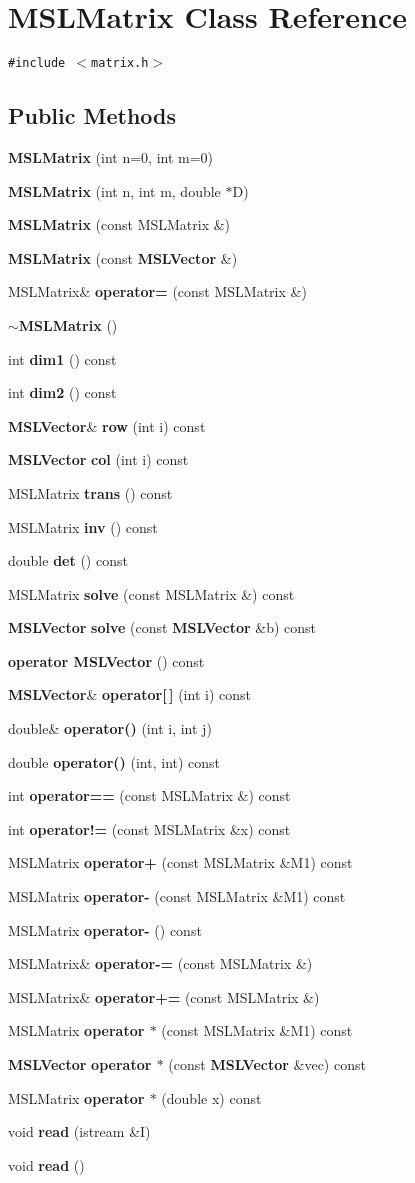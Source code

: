 \section{MSLMatrix  Class Reference}
\label{classMSLMatrix}
{\tt \#include $<$matrix.h$>$}

\subsection*{Public Methods}
\begin{CompactItemize}
\item 
{\bf MSLMatrix} (int n=0, int m=0)
\item 
{\bf MSLMatrix} (int n, int m, double $\ast$D)
\item 
{\bf MSLMatrix} (const MSLMatrix \&)
\item 
{\bf MSLMatrix} (const {\bf MSLVector} \&)
\item 
MSLMatrix\& {\bf operator=} (const MSLMatrix \&)
\item 
{\bf $\sim$MSLMatrix} ()
\item 
int {\bf dim1} () const
\item 
int {\bf dim2} () const
\item 
{\bf MSLVector}\& {\bf row} (int i) const
\item 
{\bf MSLVector} {\bf col} (int i) const
\item 
MSLMatrix {\bf trans} () const
\item 
MSLMatrix {\bf inv} () const
\item 
double {\bf det} () const
\item 
MSLMatrix {\bf solve} (const MSLMatrix \&) const
\item 
{\bf MSLVector} {\bf solve} (const {\bf MSLVector} \&b) const
\item 
{\bf operator MSLVector} () const
\item 
{\bf MSLVector}\& {\bf operator[$\,$]} (int i) const
\item 
double\& {\bf operator()} (int i, int j)
\item 
double {\bf operator()} (int, int) const
\item 
int {\bf operator==} (const MSLMatrix \&) const
\item 
int {\bf operator!=} (const MSLMatrix \&x) const
\item 
MSLMatrix {\bf operator+} (const MSLMatrix \&M1) const
\item 
MSLMatrix {\bf operator-} (const MSLMatrix \&M1) const
\item 
MSLMatrix {\bf operator-} () const
\item 
MSLMatrix\& {\bf operator-=} (const MSLMatrix \&)
\item 
MSLMatrix\& {\bf operator+=} (const MSLMatrix \&)
\item 
MSLMatrix {\bf operator $\ast$} (const MSLMatrix \&M1) const
\item 
{\bf MSLVector} {\bf operator $\ast$} (const {\bf MSLVector} \&vec) const
\item 
MSLMatrix {\bf operator $\ast$} (double x) const
\item 
void {\bf read} (istream \&I)
\item 
void {\bf read} ()
\end{CompactItemize}

